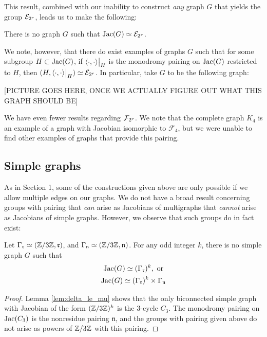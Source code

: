 \documentclass{amsart}
\begin{document}
This result, combined with our inability to construct \emph{any} graph
$G$ that yields the group $\mathcal{E}_{2^{r}}$, leads us to make the following:

\begin{conj}
  There is no graph $G$ such that $\operatorname{Jac}(G) \simeq \mathcal{E}_{2^{r}}$.
\end{conj}

We note, however, that there do exist examples of graphs $G$ such that
for some subgroup $H \subset \operatorname{Jac}(G)$, if $\langle \cdot, \cdot \rangle\big|_H$ is
the monodromy pairing on $\operatorname{Jac}(G)$ restricted to $H$, then $(H,
\langle \cdot, \cdot \rangle\big|_H) \simeq \mathcal{E}_{2^{r}}$. In particular, take $G$ to be
the following graph:

[PICTURE GOES HERE, ONCE WE ACTUALLY FIGURE OUT WHAT THIS GRAPH SHOULD
BE]

We have even fewer results regarding $\mathcal{F}_{2^{r}}$. We note that the complete
graph $K_4$ is an example of a graph with Jacobian isomorphic to
$\mathcal{F}_4$, but we were unable to find other examples of graphs
that provide this pairing.

\subsection{Simple graphs}
As in Section 1, some of the constructions given above are only
possible if we allow multiple edges on our graphs. We do not have a
broad result concerning groups with pairing that \emph{can} arise as
Jacobians of multigraphs that \emph{cannot} arise as Jacobians of
simple graphs. However, we observe that such groups do in fact exist:

\begin{thm}
  Let $\Gamma_\mathfrak{r} \simeq (\mathbb{Z}/3\mathbb{Z}, \mathfrak{r})$, and
  $\Gamma_\mathfrak{n} \simeq (\mathbb{Z}/3\mathbb{Z}, \mathfrak{n})$. For any odd
  integer $k$, there is no simple graph $G$ such that
  \begin{align*}
      \operatorname{Jac}(G) \simeq (\Gamma_\mathfrak{r})^k, \text{ or } \\
      \operatorname{Jac}(G) \simeq (\Gamma_\mathfrak{r})^k \times \Gamma_\mathfrak{n}
  \end{align*}
\end{thm}
\begin{proof}
Lemma \ref{lem:delta_le_mu} shows that the only biconnected simple
graph with Jacobian of the form $(\mathbb{Z}/3\mathbb{Z})^k$ is the $3$-cycle
$C_3$. The monodromy pairing on $\operatorname{Jac}(C_3)$ is the nonresidue pairing
$\mathfrak{n}$, and the groups with pairing given above do not arise
as powers of $\mathbb{Z}/3\mathbb{Z}$ with this pairing. 
\end{proof}
\end{document}
